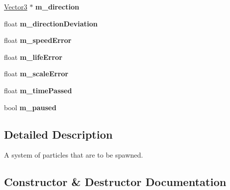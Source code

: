 \begin{DoxyCompactItemize}
\hyperlink{class_flounder_1_1_vector3}{Vector3} $\ast$ {\bfseries m\+\_\+direction}
\item 
\mbox{\label{class_flounder_1_1_particle_system_abaa547c477c8773f0126dcc370ea71aa}} 
float {\bfseries m\+\_\+direction\+Deviation}
\item 
\mbox{\label{class_flounder_1_1_particle_system_a2b40db2d21e1c3988e0f02408223e59a}} 
float {\bfseries m\+\_\+speed\+Error}
\item 
\mbox{\label{class_flounder_1_1_particle_system_ac1ddbdde66cca3c54df8d5a479249e23}} 
float {\bfseries m\+\_\+life\+Error}
\item 
\mbox{\label{class_flounder_1_1_particle_system_aee419680de2d11e61ca7949a74975b16}} 
float {\bfseries m\+\_\+scale\+Error}
\item 
\mbox{\label{class_flounder_1_1_particle_system_a24e1ba3b9590e4798c91b4767caa5a08}} 
float {\bfseries m\+\_\+time\+Passed}
\item 
\mbox{\label{class_flounder_1_1_particle_system_a4b46b0b409f5a84cecfcbb746c78e740}} 
bool {\bfseries m\+\_\+paused}
\end{DoxyCompactItemize}


\subsection{Detailed Description}
A system of particles that are to be spawned. 



\subsection{Constructor \& Destructor Documentation}
\mbox{\label{class_flounder_1_1_particle_system_ac22167bc60b6a566fc5ff35bb960e099}} 
